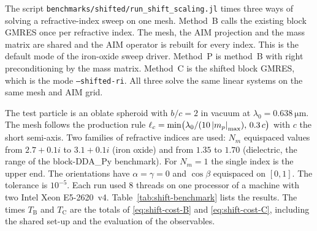 \documentclass[11pt,a4paper]{article}
\begin{document}
\begin{sloppypar}
The script \nolinkurl{benchmarks/shifted/run_shift_scaling.jl} times
three ways of solving a refractive-index sweep on one mesh.
Method~B calls the existing block GMRES once per refractive index.
The mesh, the AIM projection and the mass matrix are shared and the
AIM operator is rebuilt for every index.
This is the default mode of the iron-oxide sweep driver.
Method~P is method~B with right preconditioning by the mass matrix.
Method~C is the shifted block GMRES, which is the mode
\texttt{--shifted-ri}.
All three solve the same linear systems on the same mesh and AIM grid.
\end{sloppypar}

The test particle is an oblate spheroid with $b/c = 2$ in vacuum at
$\lambda_0 = \SI{0.638}{\micro\meter}$.
The mesh follows the production rule
$\ell_c = \min\bigl(\lambda_0/(10\,\abs{m_p}_{\max}),\,0.3\,c\bigr)$
with $c$ the short semi-axis.
Two families of refractive indices are used: $N_m$ equispaced values
from $2.7 + 0.1i$ to $3.1 + 0.1i$ (iron oxide) and from $1.35$ to
$1.70$ (dielectric, the range of the block-DDA\_Py benchmark).
For $N_m = 1$ the single index is the upper end.
The orientations have $\alpha = \gamma = 0$ and $\cos\beta$ equispaced
on $[0, 1]$.
The tolerance is $10^{-5}$.
Each run used 8 threads on one processor of a machine with two Intel
Xeon E5-2620~v4.
Table~\ref{tab:shift-benchmark} lists the results.
The times $T_{\text{B}}$ and $T_{\text{C}}$ are the totals of
\eqref{eq:shift-cost-B} and \eqref{eq:shift-cost-C}, including the
shared set-up and the evaluation of the observables.
\end{document}
